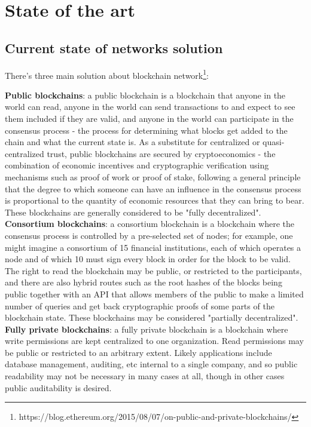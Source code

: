 \chapter{State of the art}

\section{Current state of networks solution}

There's three main solution about blockchain network\footnote{https://blog.ethereum.org/2015/08/07/on-public-and-private-blockchains/}:

\begin{outline}
    \1 \textbf{Public blockchains}: a public blockchain is a blockchain that anyone in the world can read, anyone in the world can send transactions to and expect to see them included if they are valid, and anyone in the world can participate in the consensus process - the process for determining what blocks get added to the chain and what the current state is. As a substitute for centralized or quasi-centralized trust, public blockchains are secured by cryptoeconomics - the combination of economic incentives and cryptographic verification using mechanisms such as proof of work or proof of stake, following a general principle that the degree to which someone can have an influence in the consensus process is proportional to the quantity of economic resources that they can bring to bear. These blockchains are generally considered to be "fully decentralized".
    \1 \textbf{Consortium blockchains}: a consortium blockchain is a blockchain where the consensus process is controlled by a pre-selected set of nodes; for example, one might imagine a consortium of 15 financial institutions, each of which operates a node and of which 10 must sign every block in order for the block to be valid. The right to read the blockchain may be public, or restricted to the participants, and there are also hybrid routes such as the root hashes of the blocks being public together with an API that allows members of the public to make a limited number of queries and get back cryptographic proofs of some parts of the blockchain state. These blockchains may be considered "partially decentralized".
    \1 \textbf{Fully private blockchains}: a fully private blockchain is a blockchain where write permissions are kept centralized to one organization. Read permissions may be public or restricted to an arbitrary extent. Likely applications include database management, auditing, etc internal to a single company, and so public readability may not be necessary in many cases at all, though in other cases public auditability is desired.
\end{outline}

